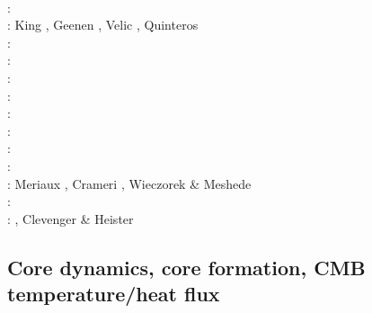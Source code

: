 \begin{scriptsize}
      \cite{zldf07}\\
\twothousandeight: \cite{zhmt08}\cite{deka08}\cite{trub08}\cite{krdp08}\cite{mamo08}\cite{gepd98}
      \cite{vack08}\cite{heta08}\cite{brtf08}\cite{daks08}\cite{chzy08}\cite{tack08}\cite{hust08b}\\
\twothousandnine: King \cite{king09}, Geenen \etal \cite{geum09}, Velic \etal \cite{vemm09}, 
                  Quinteros \etal \cite{qurj09}\\
\twothousandten: \cite{kaus10}\cite{kamm10}\cite{egat10}\cite{kilv10}\\
\twothousandeleven: \cite{dumg11}\cite{uibb11}\cite{hegc11}\cite{muso11}\cite{dawk11}\cite{lemm11}\\
\twothousandtwelve: \cite{crsg12}\cite{chgv12}\cite{krwd12}\cite{may12}\cite{gerb12}\cite{asmo12}\\
\twothousandthirteen: \cite{chtl13}\cite{kemk13}\cite{gemd13}\cite{hutm13}\\
\twothousandfourteen: \cite{thmk14}\cite{mabl14}\cite{lopp14}\cite{stlh14}\\
\twothousandfifteen: \cite{lelk15}\cite{rumi15}\cite{chpe15}\cite{mabl15}\\
\twothousandsixteen: \cite{dumy16}\cite{blmp16}\\
\twothousandseventeen: \cite{robh17}\cite{wisv17}\cite{majc17}\\
\twothousandeighteen: Meriaux \etal \cite{memm18}, Crameri \cite{cram18}, Wieczorek \& Meshede \cite{wime18}\\
\twothousandnineteen: \cite{liki19}\cite{demh19}\cite{galb19}\cite{frtv19}\cite{yuwa19}\cite{ropu19}\\
\twothousandtwenty: \cite{homb20}\cite{trlb20}\cite{gadb20}\cite{jaca20a,jaca20b}, Clevenger \& Heister \cite{clhe20}
\end{scriptsize}

\subsection{Core dynamics, core formation, CMB temperature/heat flux}


